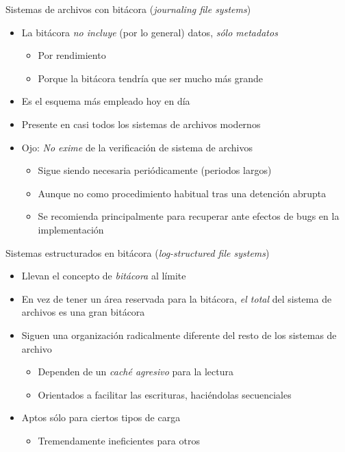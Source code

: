 \documentclass[presentation]{beamer}
\begin{document}
\begin{frame}[label={sec:org16e38d1}]{Sistemas de archivos con bitácora (\emph{journaling file systems})}
\begin{itemize}
\item La bitácora \emph{no incluye} (por lo general) datos, \emph{sólo metadatos}
\begin{itemize}
\item Por rendimiento
\item Porque la bitácora tendría que ser mucho más grande
\end{itemize}
\item Es el esquema más empleado hoy en día
\item Presente en casi todos los sistemas de archivos modernos
\item Ojo: \emph{No exime} de la verificación de sistema de archivos
\begin{itemize}
\item Sigue siendo necesaria periódicamente (periodos largos)
\item Aunque no como procedimiento habitual tras una detención abrupta
\item Se recomienda principalmente para recuperar ante efectos de bugs
en la implementación
\end{itemize}
\end{itemize}
\end{frame}

\begin{frame}[label={sec:org28dc351}]{Sistemas estructurados en bitácora (\emph{log-structured file systems})}
\begin{itemize}
\item Llevan el concepto de \emph{bitácora} al límite
\item En vez de tener un área reservada para la bitácora, \emph{el total} del
sistema de archivos es una gran bitácora
\item Siguen una organización radicalmente diferente del resto de los
sistemas de archivo
\begin{itemize}
\item Dependen de un \emph{caché agresivo} para la lectura
\item Orientados a facilitar las escrituras, haciéndolas secuenciales
\end{itemize}
\item Aptos sólo para ciertos tipos de carga
\begin{itemize}
\item Tremendamente ineficientes para otros
\end{itemize}
\end{itemize}
\end{frame}
\end{document}
